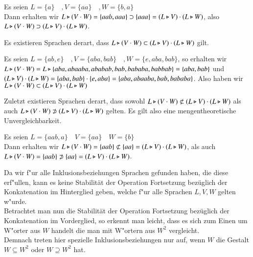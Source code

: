 \vspace{2ex}

\begin{beispiel}
Es seien $L=\{a\}\quad ,V=\{aa\}\quad ,W=\{b,a\} $\\
Dann erhalten wir $L\triangleright (V\cdot W) = \{aab,aaa\} \supset  \{aaa\} = (L\triangleright V) \cdot (L\triangleright W)$, also $L\triangleright (V\cdot W) \supset (L\triangleright V) \cdot (L\triangleright W)$.
\end{beispiel}
Es existieren Sprachen derart, dass $L\triangleright (V\cdot W) \subset (L\triangleright V)\cdot (L\triangleright W)$ gilt.

\vspace{2ex}

\begin{beispiel}
Es seien  $L=\{ab,e\}\quad ,V=\{aba,bab\}\quad ,W=\{e,aba,bab\} $, so erhalten wir \\
$L\triangleright (V\cdot W) = L \triangleright \{aba,abaaba,ababab,bab,bababa,babbab\} = \{ aba,bab\}$ und $(L\triangleright V)\cdot (L\triangleright W) = \{aba,bab\} \cdot \{e,aba\} = \{aba,abaaba,bab,bababa\}$. 
Also haben wir $L\triangleright (V\cdot W) \subset (L\triangleright V)\cdot (L\triangleright W)$
\end{beispiel}
Zuletzt existieren Sprachen derart, dass sowohl $L\triangleright (V\cdot W) \not\subset (L\triangleright V)\cdot (L\triangleright W)$ als auch $L\triangleright (V\cdot W) \not\supset (L\triangleright V)\cdot (L\triangleright W)$ gelten. Es gilt also eine mengentheoretische Unvergleichbarkeit.

\vspace{2ex}

\begin{beispiel}
Es seien $L=\{aab,a\}\quad V=\{aa\}\quad W=\{b\}$\\
Dann erhalten wir $L\triangleright (V\cdot W) = \{aab\} \not\subset \{aa\} = (L\triangleright V) \cdot (L\triangleright W)$, als auch $L\triangleright (V\cdot W) = \{aab\} \not\supset \{aa\} = (L\triangleright V) \cdot (L\triangleright W)$.
\end{beispiel}

Da wir f"ur alle Inklusionsbeziehungen Sprachen gefunden haben, die diese erf"ullen, kann es keine Stabilität der Operation Fortsetzung bezüglich der Konkatenation im Hinterglied geben, welche f"ur alle Sprachen $L,V,W$ gelten w"urde.\\

Betrachtet man nun die Stabilität der Operation Fortsetzung bezüglich der Konkatenation im Vorderglied, so erkennt man leicht, dass es sich 
zum Einen um W"orter aus $W$ handelt die man mit W"ortern aus $W^2$ vergleicht.\\
Demnach treten hier spezielle Inklusionsbeziehungen nur auf, wenn $W$ die Gestalt $W\subseteq W^2$ oder $W\supseteq W^2$ hat.

